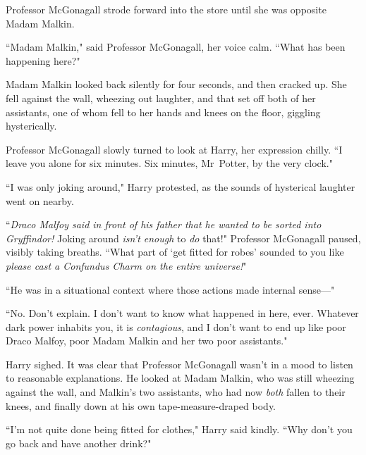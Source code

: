 Professor McGonagall strode forward into the store until she was opposite Madam Malkin.

``Madam Malkin," said Professor McGonagall, her voice calm. ``What has been happening here?"

Madam Malkin looked back silently for four seconds, and then cracked up. She fell against the wall, wheezing out laughter, and that set off both of her assistants, one of whom fell to her hands and knees on the floor, giggling hysterically.

Professor McGonagall slowly turned to look at Harry, her expression chilly. ``I leave you alone for six minutes. Six minutes, Mr~Potter, by the very clock."

``I was only joking around," Harry protested, as the sounds of hysterical laughter went on nearby.

``\emph{Draco Malfoy said in front of his father that he wanted to be sorted into Gryffindor!} Joking around \emph{isn't enough} to \emph{do} that!" Professor McGonagall paused, visibly taking breaths. ``What part of `get fitted for robes' sounded to you like \emph{please cast a Confundus Charm on the entire universe!}"

``He was in a situational context where those actions made internal sense—"

``No. Don't explain. I don't want to know what happened in here, ever. Whatever dark power inhabits you, it is \emph{contagious}, and I don't want to end up like poor Draco Malfoy, poor Madam Malkin and her two poor assistants."

Harry sighed. It was clear that Professor McGonagall wasn't in a mood to listen to reasonable explanations. He looked at Madam Malkin, who was still wheezing against the wall, and Malkin's two assistants, who had now \emph{both} fallen to their knees, and finally down at his own tape-measure-draped body.

``I'm not quite done being fitted for clothes," Harry said kindly. ``Why don't you go back and have another drink?"

